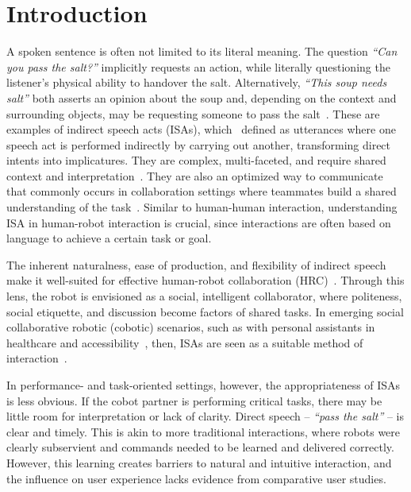 \section{Introduction}
A spoken sentence is often not limited to its literal meaning. The question \textit{``Can you pass the salt?''} implicitly requests an action, while literally questioning the listener's physical ability to handover the salt. Alternatively, \textit{``This soup needs salt''} both asserts an opinion about the soup and, depending on the context and surrounding objects, may be requesting someone to pass the salt~\cite{clark1979responding}. These are examples of indirect speech acts (ISAs), which~\citet{searle1975indirect} defined as utterances where one speech act is performed indirectly by carrying out another, transforming direct intents into implicatures. They are complex, multi-faceted, and require shared context and interpretation~\cite{searle1975indirect}. They are also an optimized way to communicate that commonly occurs in collaboration settings where teammates build a shared understanding of the task~\cite{clark1986referring}. Similar to human-human interaction, understanding ISA in human-robot interaction is crucial, since interactions are often based on language to achieve a certain task or goal. 

The inherent naturalness, ease of production, and flexibility of indirect speech make it well-suited for effective human-robot collaboration (HRC)~\cite{obaigbena2024ai, liu2019review}. Through this lens, the robot is envisioned as a social, intelligent collaborator, where politeness, social etiquette, and discussion become factors of shared tasks. In emerging social collaborative robotic (cobotic) scenarios, such as with personal assistants in healthcare and accessibility~\cite{carros2020exploring, zhang2023follower}, then, ISAs are seen as a suitable method of interaction~\cite{williams2020excuse}. 

In performance- and task-oriented settings, however, the appropriateness of ISAs is less obvious. If the cobot partner is performing critical tasks, there may be little room for interpretation or lack of clarity. Direct speech -- \textit{``pass the salt''} -- is clear and timely. This is akin to more traditional interactions, where robots were clearly subservient and commands needed to be learned and delivered correctly. However, this learning creates barriers to natural and intuitive interaction, and the influence on user experience lacks evidence from comparative user studies. 
 
